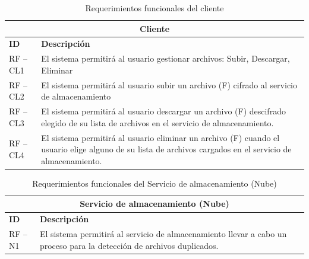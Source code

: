\begin{table}[htb]
\centering
\begin{tabular}{| p{2cm} |  p{13.5cm} |}
\hline
\multicolumn{2}{|c|}{\textbf{Cliente}} \\ \hline
\textbf{ID} &  \textbf{Descripción} \\
\hline \hline
RF – CL1 & El sistema permitirá al usuario gestionar archivos: Subir, Descargar, Eliminar \\ \hline
RF – CL2 & El sistema permitirá al usuario subir un archivo (F) cifrado al servicio de almacenamiento   \\ \hline
RF – CL3 & El sistema permitirá al usuario descargar un archivo (F) descifrado elegido de su lista de archivos en el servicio de almacenamiento. \\ \hline
RF – CL4 &El sistema permitirá al usuario eliminar un archivo (F) cuando el usuario elige alguno de su lista de archivos cargados en el servicio de almacenamiento.   \\ \hline
\end{tabular}
\caption{Requerimientos funcionales del cliente}
\label{Cliente }
\end{table}


\begin{table}[htb]
\centering
\begin{tabular}{| p{2cm} |  p{13.5cm} |}
\hline
\multicolumn{2}{|c|}{\textbf{Servicio de almacenamiento (Nube)}} \\ \hline
\textbf{ID} &  \textbf{Descripción} \\
\hline \hline

RF – N1 & El sistema permitirá al servicio de almacenamiento llevar a cabo un proceso para la detección de archivos duplicados.  \\ \hline

\end{tabular}
\caption{Requerimientos funcionales del Servicio de almacenamiento (Nube)}
\label{Servicio de almacenamiento (Nube) }
\end{table}
\vspace{9cm}
